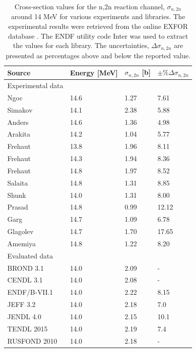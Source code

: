 \begin{table}[H]
  \footnotesize
  \centering
  \begin{tabularx}{\textwidth}{XXXX}
    \toprule
    Source & Energy [MeV] & $\sigma_{n,2n}$ [b] & $\pm\%\Delta\sigma_{n,2n}$ \\
    \midrule
    Experimental data &      &      &    \\
    \midrule
    Ngoc & 14.6 & 1.27 & 7.61 \\
    Simakov & 14.1 & 2.38 & 5.88 \\
    Anders & 14.6 & 1.36 & 4.98 \\
    Arakita & 14.2 & 1.04 & 5.77 \\
    Frehaut & 13.8 & 1.96 & 8.11 \\
    Frehaut & 14.3 & 1.94 & 8.36 \\
    Frehaut & 14.8 & 1.97 & 8.52 \\
    Salaita & 14.8 & 1.31 & 8.85 \\
    Shunk & 14.0 & 1.31 & 8.00 \\
    Prasad & 14.8 & 0.99 & 12.12 \\
    Garg & 14.7 & 1.09 & 6.78 \\
    Glagolev & 14.7 & 1.70 & 17.65 \\
    Amemiya & 14.8 & 1.22 & 8.20 \\
    \midrule
    Evaluated data &      &      &    \\
    \midrule
    BROND 3.1 & 14.0 & 2.09 & - \\
    CENDL 3.1 & 14.0 & 2.08 & - \\
    ENDF/B-VII.1 & 14.0 & 2.22 & 8.15 \\
    JEFF 3.2 & 14.0 & 2.18 & 7.0 \\
    JENDL 4.0 & 14.0 & 2.15 & 10.1 \\
    TENDL 2015 & 14.0 & 2.19 & 7.4 \\
    RUSFOND 2010 & 14.0 & 2.18 & - \\
    \bottomrule
  \end{tabularx}
  \caption{Cross-section values for the n,2n reaction channel, $\sigma_{n,2n}$ around 14 MeV for various experiments and libraries. The experimental results were retrieved from the online EXFOR database \cite{exfor2017}. The ENDF utility code Inter \cite{Dunford2002} was used to extract the values for each library. The uncertainties, $\Delta\sigma_{n,2n}$ are presented as percentages above and below the reported value.}
  \label{tab:lead_by_lib}
\end{table}


